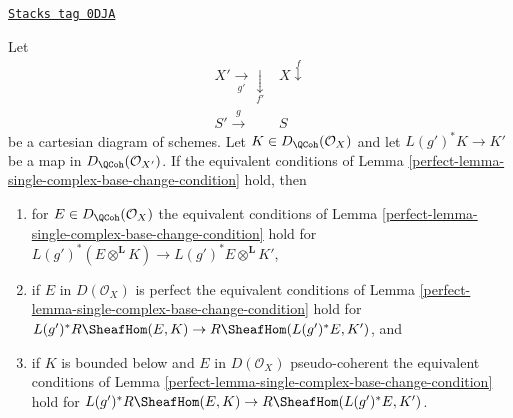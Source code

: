 \begin{lemma}
\label{perfect-lemma-single-complex-base-change-condition-inherited}
\href{https://stacks.math.columbia.edu/tag/0DJA}{\texttt{Stacks tag 0DJA}}

Let
$$
\begin{array}{cc}X' \underset{g'}{\longrightarrow}\underset{f'}{\downarrow} & X \overset{f}{\downarrow} \\ S' \overset{g}{\longrightarrow} & S\end{array}
$$
be a cartesian diagram of schemes. Let $K \in D_\QCoh(\mathcal{O}_X)$
and let $L(g')^*K \to K'$ be a map in $D_\QCoh(\mathcal{O}_{X'})$.
If the equivalent conditions of
Lemma \ref{perfect-lemma-single-complex-base-change-condition} hold, then
\begin{enumerate}
\item for $E \in D_\QCoh(\mathcal{O}_X)$ the equivalent
conditions of Lemma \ref{perfect-lemma-single-complex-base-change-condition} hold
for $L(g')^*(E \otimes^\mathbf{L} K) \to L(g')^*E \otimes^\mathbf{L} K'$,
\item if $E$ in $D(\mathcal{O}_X)$ is perfect the equivalent conditions of
Lemma \ref{perfect-lemma-single-complex-base-change-condition} hold for
$L(g')^*R\SheafHom(E, K) \to R\SheafHom(L(g')^*E, K')$, and
\item if $K$ is bounded below and $E$ in $D(\mathcal{O}_X)$
pseudo-coherent the equivalent conditions of
Lemma \ref{perfect-lemma-single-complex-base-change-condition} hold for
$L(g')^*R\SheafHom(E, K) \to R\SheafHom(L(g')^*E, K')$.
\end{enumerate}
\end{lemma}

